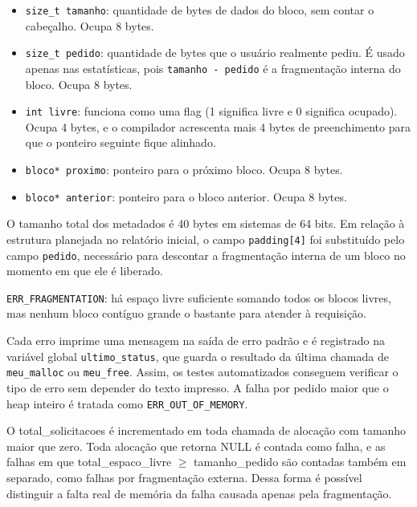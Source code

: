 \begin{itemize}
    \item \texttt{size\_t tamanho}: quantidade de bytes de dados do bloco, sem contar o cabeçalho. Ocupa 8 bytes.
    \item \texttt{size\_t pedido}: quantidade de bytes que o usuário realmente pediu. É usado apenas nas estatísticas, pois \texttt{tamanho - pedido} é a fragmentação interna do bloco. Ocupa 8 bytes.
    \item \texttt{int livre}: funciona como uma flag (1 significa livre e 0 significa ocupado). Ocupa 4 bytes, e o compilador acrescenta mais 4 bytes de preenchimento para que o ponteiro seguinte fique alinhado.
    \item \texttt{bloco* proximo}: ponteiro para o próximo bloco. Ocupa 8 bytes.
    \item \texttt{bloco* anterior}: ponteiro para o bloco anterior. Ocupa 8 bytes.
\end{itemize}

O tamanho total dos metadados é 40 bytes em sistemas de 64 bits. Em relação à
estrutura planejada no relatório inicial, o campo \texttt{padding[4]} foi
substituído pelo campo \texttt{pedido}, necessário para descontar a
fragmentação interna de um bloco no momento em que ele é liberado.

\item \texttt{ERR\_FRAGMENTATION}: há espaço livre suficiente somando todos os blocos livres, mas nenhum bloco contíguo grande o bastante para atender à requisição.

Cada erro imprime uma mensagem na saída de erro padrão e é registrado na
variável global \texttt{ultimo\_status}, que guarda o resultado da última
chamada de \texttt{meu\_malloc} ou \texttt{meu\_free}. Assim, os testes
automatizados conseguem verificar o tipo de erro sem depender do texto
impresso. A falha por pedido maior que o heap inteiro é tratada como
\texttt{ERR\_OUT\_OF\_MEMORY}.

O total\_solicitacoes é incrementado em toda chamada de alocação com tamanho
maior que zero. Toda alocação que retorna NULL é contada como falha, e as
falhas em que total\_espaco\_livre $\geq$ tamanho\_pedido são contadas também
em separado, como falhas por fragmentação externa. Dessa forma é possível
distinguir a falta real de memória da falha causada apenas pela fragmentação.


